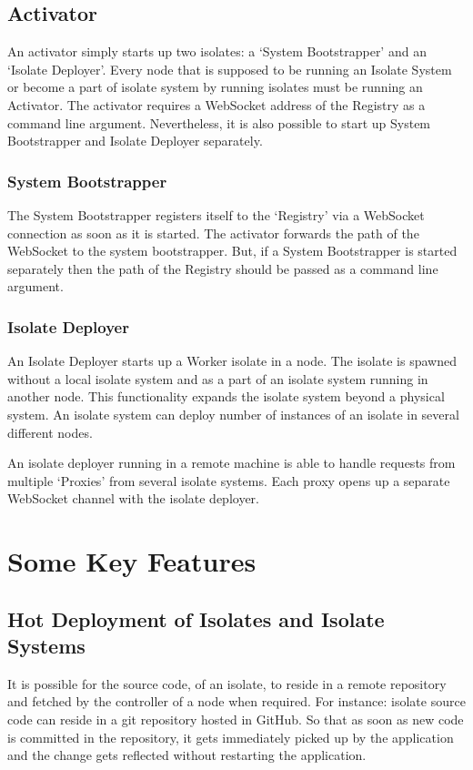 \subsection{Activator}
  An activator simply starts up two isolates: a ‘System Bootstrapper’ and an ‘Isolate Deployer’. Every node that is supposed to be running an Isolate System or become a part of isolate system by running isolates must be running an Activator. The activator requires a WebSocket address of the Registry as a command line argument. Nevertheless, it is also possible to start up System Bootstrapper and Isolate Deployer separately.

  \subsubsection{System Bootstrapper}
  The System Bootstrapper registers itself to the ‘Registry’ via a WebSocket connection as soon as it is started. The activator forwards the path of the WebSocket to the system bootstrapper. But, if a System Bootstrapper is started separately then the path of the Registry should be passed as a command line argument.

  \subsubsection{Isolate Deployer}
An Isolate Deployer starts up a Worker isolate in a node. The isolate is spawned without a local isolate system and as a part of an isolate system running in another node. This functionality expands the isolate system beyond a physical system. An isolate system can deploy number of instances of an isolate in several different nodes.

  An isolate deployer running in a remote machine is able to handle requests from multiple ‘Proxies’ from several isolate systems. Each proxy opens up a separate WebSocket channel with the isolate deployer.

\section{Some Key Features}
\subsection{Hot Deployment of Isolates and Isolate Systems}
It is possible for the source code, of an isolate, to reside in a remote repository and fetched by the controller of a node when required. For instance: isolate source code can reside in a git repository hosted in GitHub. So that as soon as new code is committed in the repository, it gets immediately picked up by the application and the change gets reflected without restarting the application.

